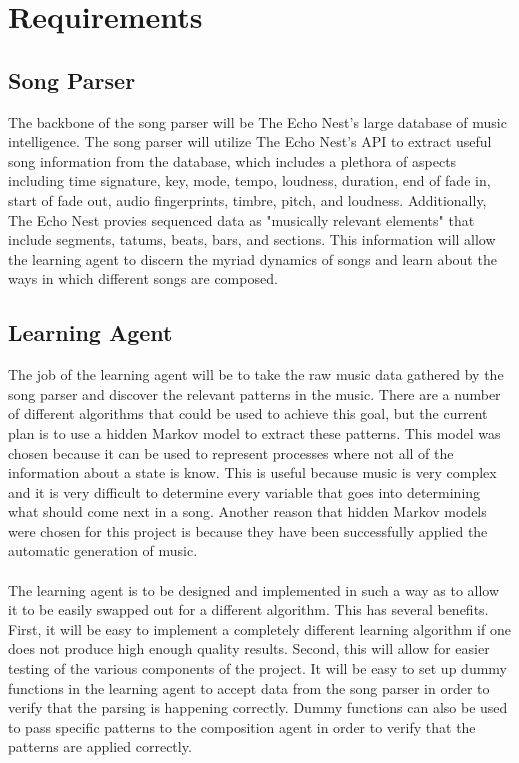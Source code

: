 \documentclass{article}
\begin{document}
\section{Requirements}
\subsection{Song Parser}
The backbone of the song parser will be The Echo Nest's large database of  music intelligence.  The song parser will utilize The Echo Nest's API to extract useful song information from the database, which includes a plethora of aspects including time signature, key, mode, tempo, loudness, duration, end of fade in, start of fade out, audio fingerprints, timbre, pitch, and loudness.  Additionally, The Echo Nest provies sequenced data as "musically relevant elements" that include segments, tatums, beats, bars, and sections. This information will allow the learning agent to discern the myriad dynamics of songs and learn about the ways in which different songs are composed.

\subsection{Learning Agent}
The job of the learning agent will be to take the raw music data gathered by the song parser and discover the relevant patterns in the music. There are a number of different algorithms that could be used to achieve this goal, but the current plan is to use a hidden Markov model to extract these patterns. This model was chosen because it can be used to represent processes where not all of the information about a state is know. This is useful because music is very complex and it is very difficult to determine every variable that goes into determining what should come next in a song. Another reason that hidden Markov models were chosen for this project is because they have been successfully applied the automatic generation of music.\\
\\
The learning agent is to be designed and implemented in such a way as to allow it to be easily swapped out for a different algorithm. This has several benefits. First, it will be easy to implement a completely different learning algorithm if one does not produce high enough quality results. Second, this will allow for easier testing of the various components of the project. It will be easy to set up dummy functions in the learning agent to accept data from the song parser in order to verify that the parsing is happening correctly. Dummy functions can also be used to pass specific patterns to the composition agent in order to verify that the patterns are applied correctly.
\end{document}
